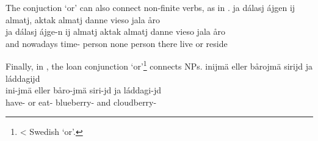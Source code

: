 The conjuction  ‘or’ can also connect non-finite verbs, as in . 
\ea\label{conjunctionEx5}%
\glll	ja dálasj ájgen ij almatj, aktak almatj danne vieso jala åro\\
	ja dálasj ájge-n ij almatj aktak almatj danne vieso jala åro\\
	and nowadays time- \BS{} person\BS{} none person\BS{} there live\BS{} or reside\BS{}\\\nopagebreak
{}	
\z

Finally, in , the loan conjunction  ‘or’\footnote{< Swedish  ‘or’.} connects NPs. 
\ea\label{conjunctionEx6}%
\glll	inijmä eller bårojmä sirijd ja láddagijd\\
	ini-jmä eller båro-jmä siri-jd ja láddagi-jd\\
	have- or eat- blueberry- and cloudberry-\\\nopagebreak
{}	
\z
{}

